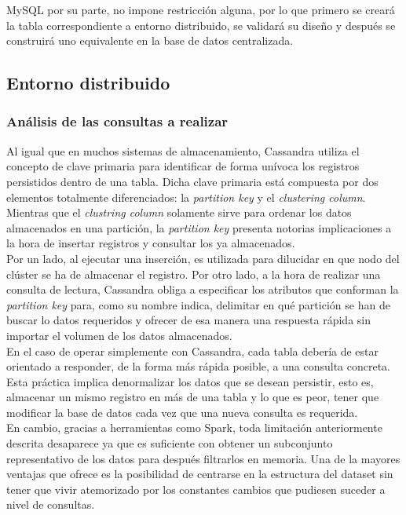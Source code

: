 MySQL por su parte, no impone restricción alguna, por lo que primero se creará la tabla correspondiente a entorno distribuido, se validará su diseño y después se construirá uno equivalente en la base de datos centralizada.

\subsection{Entorno distribuido}

\subsubsection{Análisis de las consultas a realizar}

Al igual que en  muchos sistemas de almacenamiento, Cassandra utiliza el concepto de clave primaria para identificar de forma unívoca los registros persistidos dentro de una tabla. Dicha clave primaria está compuesta por dos elementos totalmente diferenciados: la \textit{partition key} y el \textit{clustering column}.\\

Mientras que el \textit{clustring column} solamente sirve para ordenar los datos almacenados en una partición, la \textit{partition key} presenta notorias implicaciones a la hora de insertar registros y consultar los ya almacenados.\\ 

Por un lado, al ejecutar una inserción, es utilizada para dilucidar en que nodo del clúster se ha de almacenar el registro. Por otro lado, a la hora de realizar una consulta  de lectura, Cassandra obliga a especificar los atributos que conforman la \textit{partition key} para, como su nombre indica, delimitar en qué partición se han de buscar lo datos requeridos y ofrecer de esa manera una respuesta rápida sin importar el volumen de los datos almacenados.\\

En el caso de operar simplemente con Cassandra, cada tabla debería de estar orientado a responder, de la forma más rápida posible, a una consulta concreta. Esta práctica implica denormalizar los datos que se desean persistir, esto es, almacenar un mismo registro en más de una tabla y lo que es peor, tener que modificar la base de datos cada vez que una nueva consulta es requerida.\\

En cambio, gracias a herramientas como Spark, toda limitación anteriormente descrita desaparece ya que es suficiente con obtener un subconjunto representativo de los datos para después filtrarlos en memoria. Una de la mayores ventajas que ofrece es la posibilidad de centrarse en la estructura del dataset sin tener que vivir atemorizado por los constantes cambios que pudiesen suceder a nivel de consultas.\\

